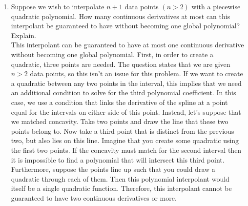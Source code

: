 \documentclass{article}
\begin{document}
\begin{enumerate}[label = {\arabic*}]
\begin{enumerate}
\begin{dgroup*}
				\begin{dmath*}
					\leq \frac{h^3}{54}\left| f'''(\xi) \right| \left| \left( (\sqrt{3} + 3) \right) \left( \sqrt{3} \right) \left( -(\sqrt{3} + 3) \right) \right|
				\end{dmath*}
				\begin{dmath*}
					\leq \frac{h^3}{54}\left| f'''(\xi) \right| \left| -12 \sqrt{3} - 18 \right|
				\end{dmath*}
				\begin{dmath*}
					\leq \frac{h^3 \left( 12 \sqrt{3} + 18 \right) }{54}\left| f'''(\xi) \right|.
				\end{dmath*}$
			\end{dgroup*}
			More generally, we can express this result as \[\left| f(x) - p_2(x) \right| \leq \frac{h^3}{54} \max_{a \leq \xi \leq b} \left| f'''(\xi) \right|.\] Therefore we have found an upper bound for the error in terms of $h$ and thus the interpolations accuracy with respect to $h$. As $h$ gets small, the accuracy will increase. You can control this by using more data points, i.e. as $n$ increases, $h$ decreases. \\
		\end{enumerate}
		
		\item Suppose we wish to interpolate $n + 1$ data points $(n > 2)$ with a piecewise quadratic polynomial. How many continuous derivatives at most can this interpolant be guaranteed to have without becoming one global polynomial? Explain. \\
		
		\hspace{15pt} This interpolant can be guaranteed to have at most one continuous derivative without becoming one global polynomial. First, in order to create a quadratic, three points are needed. The question states that we are given $n > 2$ data points, so this isn't an issue for this problem. If we want to create a quadratic between any two points in the interval, this implies that we need an additional condition to solve for the third polynomial coefficient. In this case, we use a condition that links the derivative of the spline at a point equal for the intervals on either side of this point. Instead, let's suppose that we matched concavity. Take two points and draw the line that these two points belong to. Now take a third point that is distinct from the previous two, but also lies on this line. Imagine that you create some quadratic using the first two points. If the concavity must match for the second interval then it is impossible to find a polynomial that will intersect this third point. Furthermore, suppose the points line up such that you could draw a quadratic through each of them. Then this polynomial interpolant would itself be a single quadratic function. Therefore, this interpolant cannot be guaranteed to have two continuous derivatives or more.
			

\end{enumerate}
\end{document}
